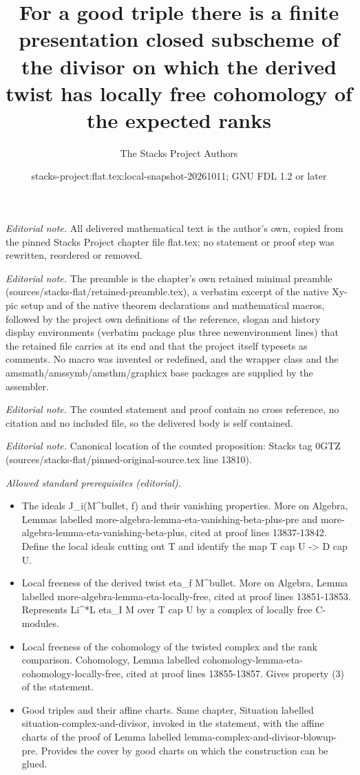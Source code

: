 \documentclass[10pt,a4paper]{amsart}
\title{For a good triple there is a finite presentation closed subscheme of the divisor on which the derived twist has locally free cohomology of the expected ranks}
\author{The Stacks Project Authors}
\date{stacks-project:flat.tex:local-snapshot-20261011; GNU FDL 1.2 or later}
\theoremstyle{plain}
\theoremstyle{definition}
\theoremstyle{remark}
\numberwithin{equation}{subsection}
\begin{document}
\maketitle
\noindent\textit{Editorial note.} All delivered mathematical text is the author's own, copied from the pinned Stacks Project chapter file flat.tex; no statement or proof step was rewritten, reordered or removed.\par\medskip
\noindent\textit{Editorial note.} The preamble is the chapter's own retained minimal preamble (sources/stacks-flat/retained-preamble.tex), a verbatim excerpt of the native Xy-pic setup and of the native theorem declarations and mathematical macros, followed by the project own definitions of the reference, slogan and history display environments (verbatim package plus three newenvironment lines) that the retained file carries at its end and that the project itself typesets as comments. No macro was invented or redefined, and the wrapper class and the amsmath/amssymb/amsthm/graphicx base packages are supplied by the assembler.\par\medskip
\noindent\textit{Editorial note.} The counted statement and proof contain no cross reference, no citation and no included file, so the delivered body is self contained.\par\medskip
\noindent\textit{Editorial note.} Canonical location of the counted proposition: Stacks tag 0GTZ (sources/stacks-flat/pinned-original-source.tex line 13810).\par\medskip
\noindent\textit{Allowed standard prerequisites (editorial).}\begin{itemize}
\item The ideals J\_i(M\textasciicircum{}bullet, f) and their vanishing properties. More on Algebra, Lemmas labelled more-algebra-lemma-eta-vanishing-beta-plus-pre and more-algebra-lemma-eta-vanishing-beta-plus, cited at proof lines 13837-13842. Define the local ideals cutting out T and identify the map T cap U -> D cap U.
\item Local freeness of the derived twist eta\_f M\textasciicircum{}bullet. More on Algebra, Lemma labelled more-algebra-lemma-eta-locally-free, cited at proof lines 13851-13853. Represents Li\textasciicircum{}*L eta\_I M over T cap U by a complex of locally free C-modules.
\item Local freeness of the cohomology of the twisted complex and the rank comparison. Cohomology, Lemma labelled cohomology-lemma-eta-cohomology-locally-free, cited at proof lines 13855-13857. Gives property (3) of the statement.
\item Good triples and their affine charts. Same chapter, Situation labelled situation-complex-and-divisor, invoked in the statement, with the affine charts of the proof of Lemma labelled lemma-complex-and-divisor-blowup-pre. Provides the cover by good charts on which the construction can be glued.
\end{itemize}\medskip
\end{document}
